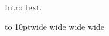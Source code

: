 \documentclass{article}
\begin{document}
Intro text.


\hbox to 10pt{wide wide wide wide}
\end{document}
